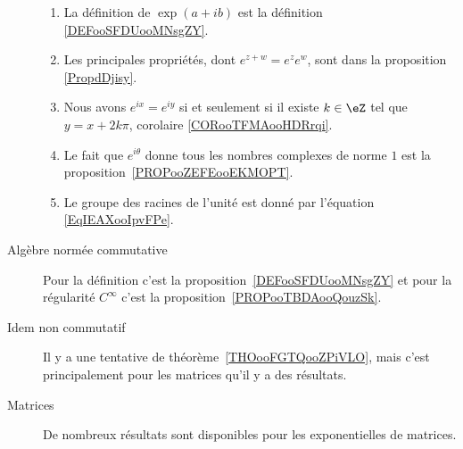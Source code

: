 \begin{description}
	      \begin{enumerate}
		      \item
		            La définition de \( \exp(a+ib)\) est la définition \ref{DEFooSFDUooMNsgZY}.
		      \item
		            Les principales propriétés, dont \(  e^{z+w}= e^{z} e^{w}\), sont dans la proposition \ref{PropdDjisy}.
		      \item
		            Nous avons \(  e^{ix}= e^{iy}\) si et seulement si il existe \( k\in\eZ\) tel que \( y=x+2k\pi\), corolaire \ref{CORooTFMAooHDRrqi}.
		      \item
		            Le fait que \(  e^{i\theta}\) donne tous les nombres complexes de norme \( 1\) est la proposition~\ref{PROPooZEFEooEKMOPT}.
		      \item
		            Le groupe des racines de l'unité est donné par l'équation \eqref{EqIEAXooIpvFPe}.
	      \end{enumerate}

	\item[Algèbre normée commutative]

	      Pour la définition c'est la proposition~\ref{DEFooSFDUooMNsgZY} et pour la régularité \(  C^{\infty}\) c'est la proposition~\ref{PROPooTBDAooQouzSk}.

	\item[Idem non commutatif]

	      Il y a une tentative de théorème~\ref{THOooFGTQooZPiVLO}, mais c'est principalement pour les matrices qu'il y a des résultats.

	\item[Matrices]

	      De nombreux résultats sont disponibles pour les exponentielles de matrices.


\end{description}

